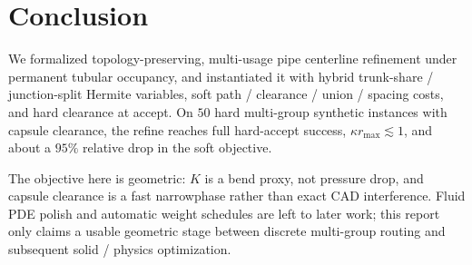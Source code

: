 
\section{Conclusion}
\label{sec:conclusion}

We formalized topology-preserving, multi-usage pipe centerline refinement under
permanent tubular occupancy, and instantiated it with hybrid trunk-share /
junction-split Hermite variables, soft path / clearance / union / spacing
costs, and hard clearance at accept.
On $50$ hard multi-group synthetic instances with capsule clearance, the refine
reaches full hard-accept success, $\kappa r_{\max}\lesssim 1$, and about a
$95\%$ relative drop in the soft objective.

The objective here is geometric: $K$ is a bend proxy, not pressure drop, and
capsule clearance is a fast narrowphase rather than exact CAD interference.
Fluid PDE polish and automatic weight schedules are left to later work; this
report only claims a usable geometric stage between discrete multi-group
routing and subsequent solid / physics optimization.
